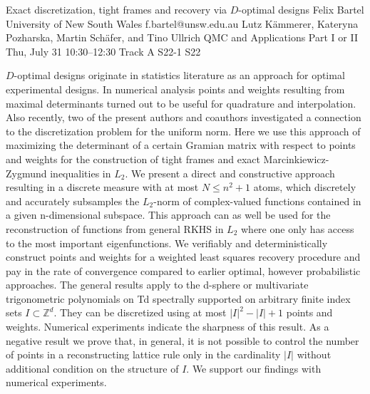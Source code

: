 \begin{talk}
  {Exact discretization, tight frames and recovery via $D$-optimal designs}%
  {Felix Bartel}%
  {University of New South Wales}%
  {f.bartel@unsw.edu.au}%
  {Lutz Kämmerer, Kateryna Pozharska, Martin Schäfer, and Tino Ullrich}%
  {QMC and Applications Part I or II}%
  {Thu, July 31 10:30–12:30 Track A}%
  {S22-1}%
  {S22}%
				
			
    $D$-optimal designs originate in statistics literature as an approach for optimal experimental designs. In numerical analysis points and weights resulting from maximal determinants turned out to be useful for quadrature and interpolation. Also recently, two of the present authors and coauthors investigated a connection to the discretization problem for the uniform norm. Here we use this approach of maximizing the determinant of a certain Gramian matrix with respect to points and weights for the construction of tight frames and exact Marcinkiewicz-Zygmund inequalities in $L_2$. We present a direct and constructive approach resulting in a discrete measure with at most $N\le n^2+1$ atoms, which discretely and accurately subsamples the $L_2$-norm of complex-valued functions contained in a given n-dimensional subspace. This approach can as well be used for the reconstruction of functions from general RKHS in $L_2$ where one only has access to the most important eigenfunctions. We verifiably and deterministically construct points and weights for a weighted least squares recovery procedure and pay in the rate of convergence compared to earlier optimal, however probabilistic approaches. The general results apply to the d-sphere or multivariate trigonometric polynomials on Td spectrally supported on arbitrary finite index sets $I\subset\mathbb Z^d$. They can be discretized using at most $|I|^2-|I|+1$ points and weights. Numerical experiments indicate the sharpness of this result. As a negative result we prove that, in general, it is not possible to control the number of points in a reconstructing lattice rule only in the cardinality $|I|$ without additional condition on the structure of $I$. We support our findings with numerical experiments.

\medskip

\end{talk}

